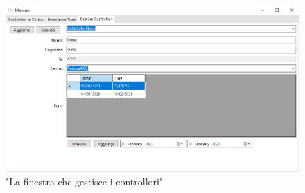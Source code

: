 \begin{figure}[H]
     \centering
     \includegraphics[width=1\textwidth]{figures/CM.PNG}
     \caption{"La finestra che gestisce i controllori"}
   \end{figure}
\pagebreak
